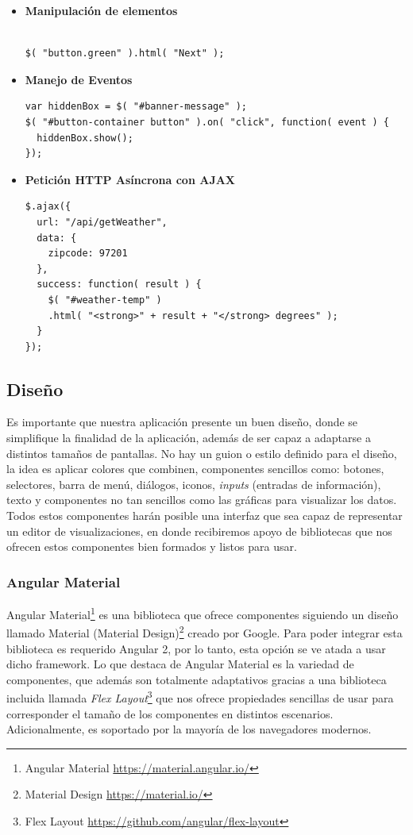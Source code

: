 \begin{itemize}

\item\textbf{Manipulación de elementos}
\begin{verbatim}

$( "button.green" ).html( "Next" );

\end{verbatim}

\item\textbf{Manejo de Eventos}
\begin{verbatim}
var hiddenBox = $( "#banner-message" );
$( "#button-container button" ).on( "click", function( event ) {
  hiddenBox.show();
});
\end{verbatim}

\item\textbf{Petición HTTP Asíncrona con AJAX}
\begin{verbatim}
$.ajax({
  url: "/api/getWeather",
  data: {
    zipcode: 97201
  },
  success: function( result ) {
    $( "#weather-temp" )
    .html( "<strong>" + result + "</strong> degrees" );
  }
});
\end{verbatim}
\end{itemize}

\subsection{Diseño}

Es importante que nuestra aplicación presente un buen diseño, donde se simplifique la finalidad de la aplicación, además de ser capaz a adaptarse a distintos tamaños de pantallas. No hay un guion o estilo definido para el diseño, la idea es aplicar colores que combinen, componentes sencillos como: botones, selectores, barra de menú, diálogos, iconos, \textit{inputs} (entradas de información), texto y componentes no tan sencillos como las gráficas para visualizar los datos. Todos estos componentes harán posible una interfaz que sea capaz de representar un editor de visualizaciones, en donde recibiremos apoyo de bibliotecas que nos ofrecen estos componentes bien formados y listos para usar.

\subsubsection{Angular Material}

Angular Material\footnote{Angular Material \url{https://material.angular.io/}} es una biblioteca que ofrece componentes siguiendo un diseño llamado Material (Material Design)\footnote{Material Design \url{https://material.io/}} creado por Google. Para poder integrar esta biblioteca es requerido Angular 2, por lo tanto, esta opción se ve atada a usar dicho framework. Lo que destaca de Angular Material es la variedad de componentes, que además son totalmente adaptativos gracias a una biblioteca incluida llamada \textit{Flex Layout}\footnote{Flex Layout \url{https://github.com/angular/flex-layout}} que nos ofrece propiedades sencillas de usar para corresponder el tamaño de los componentes en distintos escenarios. Adicionalmente, es soportado por la mayoría de los navegadores modernos.

